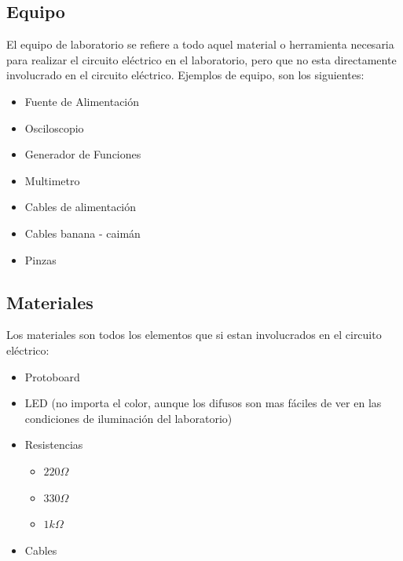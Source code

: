 
\subsection{Equipo}

	El equipo de laboratorio se refiere a todo aquel material o herramienta necesaria para realizar el circuito eléctrico en el laboratorio, pero que no esta directamente involucrado en el circuito eléctrico. Ejemplos de equipo, son los siguientes:

	\begin{itemize}
		\item Fuente de Alimentación
		\item Osciloscopio
		\item Generador de Funciones
		\item Multimetro
		\item Cables de alimentación
		\item Cables banana - caimán
		\item Pinzas
	\end{itemize}


\subsection{Materiales}

	Los materiales son todos los elementos que si estan involucrados en el circuito eléctrico:

	\begin{itemize}
		\item Protoboard
		\item LED (no importa el color, aunque los difusos son mas fáciles de ver en las condiciones de iluminación del laboratorio)
		\item Resistencias
		\begin{itemize}
			\item $220 \Omega$
			\item $330 \Omega$
			\item $1 k\Omega$
		\end{itemize}
		\item Cables
	\end{itemize}

